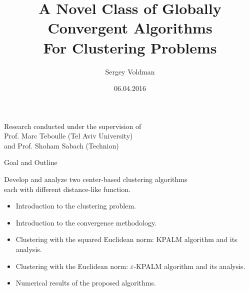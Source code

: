 \documentclass[9pt,handout]{beamer} %
\author[Sergey Voldman]{Sergey Voldman}
\newenvironment{displaybox}[1]
{
  \centerline\bgroup\hfill
  \begin{beamerboxesrounded}[lower=default,shadow=true,width=#1]{}
}
{
  \end{beamerboxesrounded}\hfill\egroup
}
\begin{document}
\title[Globally Convergent Algorithms for Clustering]{A Novel Class of Globally Convergent Algorithms \\ \vspace{0.1in} For Clustering Problems}
\date{06.04.2016}

	\begin{frame}
		\titlepage
		\begin{center}
			Research conducted under the supervision of\\ \smallskip
			Prof. Marc Teboulle (Tel Aviv University)\\ \smallskip
			and Prof. Shoham Sabach (Technion)
		\end{center}
	\end{frame}

    \begin{frame}{Goal and Outline}

    	\begin{displaybox}{10cm}
    		\begin{center}
				Develop and analyze two center-based clustering algorithms \\ each with different distance-like function.	        
        	\end{center}
        \end{displaybox}

        \vspace{0.03in}
        \pause
        \begin{itemize}[<+->]
        	\item Introduction to the clustering problem. \vspace{0.15in}
        	\item Introduction to the convergence methodology. \vspace{0.15in}
            \item Clustering with the squared Euclidean norm: KPALM algorithm and its analysis. \vspace{0.15in}
            \item Clustering with the Euclidean norm: $\varepsilon$-KPALM algorithm and its analysis. \vspace{0.15in}
            \item Numerical results of the proposed algorithms.
        \end{itemize}
    \end{frame}
\end{document}
